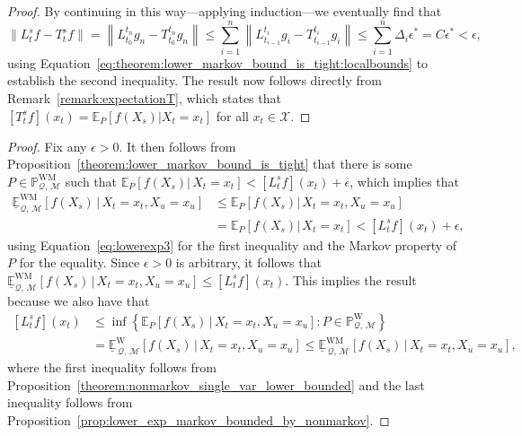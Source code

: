 \documentclass[10pt,a4paper]{paper}
\theoremstyle{definition}
\newcommand{\states}{\mathcal{X}}
\newcommand{\processes}{\mathbb{P}}
\newcommand{\wprocesses}{\processes^{\mathrm{W}}}
\newcommand{\wmprocesses}{\processes^{\mathrm{WM}}}
\newcommand{\rateset}{\mathcal{Q}}
\newcommand{\norm}[1]{\left\lVert #1 \right\rVert}
\begin{document}
\begin{proof}
By continuing in this way---applying induction---we eventually find that
\begin{equation*}
\norm{L_t^sf - T_t^sf}=\norm{L_{t_0}^{t_n}g_n - T_{t_0}^{t_n}g_n} 
\leq \sum_{i=1}^{n} \norm{L_{t_{i-1}}^{t_i}g_i - T_{t_{i-1}}^{t_i}g_i}\leq\sum_{i=1}^n\Delta_i\epsilon^*=C\epsilon^*<\epsilon,
\end{equation*}
using Equation~\eqref{eq:theorem:lower_markov_bound_is_tight:localbounds} to establish the second inequality. The result now follows directly from Remark~\ref{remark:expectationT}, which states that $[T_t^sf](x_t)=\mathbb{E}_P[f(X_s)\vert X_t=x_t]$ for all $x_t\in\states$.
\end{proof}

\corloweroperatorisinfimum*
\begin{proof}
Fix any $\epsilon>0$.
It then follows from Proposition~\ref{theorem:lower_markov_bound_is_tight} that there is some $P\in\wmprocesses_{\rateset,\,\mathcal{M}}$ such that $\mathbb{E}_P[f(X_s)\vert\,X_t=x_t] < [L_t^sf](x_t)+\epsilon$, which implies that
\begin{align*}
\underline{\mathbb{E}}^{\mathrm{WM}}_{\rateset,\,\mathcal{M}}\left[f(X_s)\,\vert\,X_t=x_t,X_u=x_u\right]
&\leq
\mathbb{E}_P[f(X_s)\vert\,X_t=x_t,X_u=x_u]\\
&=\mathbb{E}_P[f(X_s)\vert\,X_t=x_t]
< [L_t^sf](x_t)+\epsilon,
\end{align*}
using Equation~\eqref{eq:lowerexp3} for the first inequality and the Markov property of $P$ for the equality. Since $\epsilon>0$ is arbitrary, it follows that  $\underline{\mathbb{E}}^{\mathrm{WM}}_{\rateset,\,\mathcal{M}}\left[f(X_s)\,\vert\,X_t=x_t,X_u=x_u\right]\leq[L_t^sf](x_t)$.
This implies the result because we also have that
\begin{align*}
\left[L_t^sf\right](x_t)
&\leq\inf\left\{\mathbb{E}_P[f(X_s)\,\vert\,X_t=x_t,X_u=x_u]\colon P\in\wprocesses_{\rateset,\,\mathcal{M}}\right\}\\
&=\underline{\mathbb{E}}^{\mathrm{W}}_{\,\rateset,\,\mathcal{M}}[f(X_s)\,\vert\,X_t=x_t,X_u=x_u] 
\leq
\underline{\mathbb{E}}^{\mathrm{WM}}_{\,\rateset,\,\mathcal{M}}[f(X_s)\,\vert\,X_t=x_t,X_u=x_u],
\end{align*}
where the first inequality follows from Proposition~\ref{theorem:nonmarkov_single_var_lower_bounded} and the last inequality follows from Proposition~\ref{prop:lower_exp_markov_bounded_by_nonmarkov}.
\end{proof}
\end{document}
